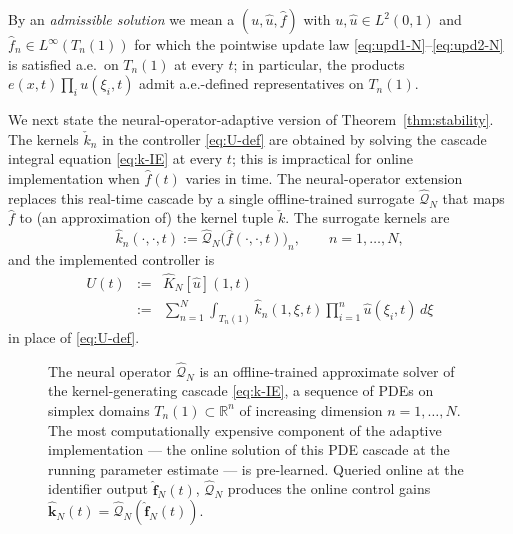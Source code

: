 \documentclass[journal,twoside,web]{ieeecolor}
\begin{document}
By an \emph{admissible solution} we mean a $(u,\hat u,\hat f)$ with $u,\hat u\in L^2(0,1)$ and $\hat f_n\in L^\infty(T_n(1))$ for which the pointwise update law \eqref{eq:upd1-N}--\eqref{eq:upd2-N} is satisfied a.e.\ on $T_n(1)$ at every $t$; in particular, the products $e(x,t)\prod_i u(\xi_i,t)$ admit a.e.-defined representatives on $T_n(1)$.

We next state the neural-operator-adaptive version of Theorem~\ref{thm:stability}. The kernels $\check k_n$ in the controller \eqref{eq:U-def} are obtained by solving the cascade integral equation \eqref{eq:k-IE} at every $t$; this is impractical for online implementation when $\hat f(t)$ varies in time. The neural-operator extension replaces this real-time cascade by a single offline-trained surrogate $\widehat{\mathcal Q}_N$ that maps $\hat f$ to (an approximation of) the kernel tuple $\check k$. The surrogate kernels are
\begin{equation}\label{eq:khat-thm}
\hat k_n(\cdot,\cdot,t):=\widehat{\mathcal Q}_N\bigl(\hat f(\cdot,\cdot,t)\bigr)_n,\qquad n=1,\ldots,N,
\end{equation}
and the implemented controller is
\begin{eqnarray}
U(t) &:=& \hat K_N[\hat u](1,t) \nonumber\\
&:=& \sum_{n=1}^N\int_{T_n(1)}\hat k_n(1,\xi,t)\prod_{i=1}^n\hat u(\xi_i,t)\,d\xi \label{eq:Uhat-thm}
\end{eqnarray}
in place of \eqref{eq:U-def}.

\begin{figure}[t]
\centering
{}
\caption{The neural operator $\widehat{\mathcal Q}_N$ is an offline-trained approximate solver of the kernel-generating cascade \eqref{eq:k-IE}, a sequence of PDEs on simplex domains $T_n(1)\subset\mathbb{R}^n$ of increasing dimension $n=1,\ldots,N$. The most computationally expensive component of the adaptive implementation --- the online solution of this PDE cascade at the running parameter estimate --- is pre-learned. Queried online at the identifier output $\hat{\mathbf f}_N(t)$, $\widehat{\mathcal Q}_N$ produces the online control gains $\hat{\mathbf k}_N(t)=\widehat{\mathcal Q}_N(\hat{\mathbf f}_N(t))$.}\label{fig:Qhat}
\end{figure}
\end{document}

